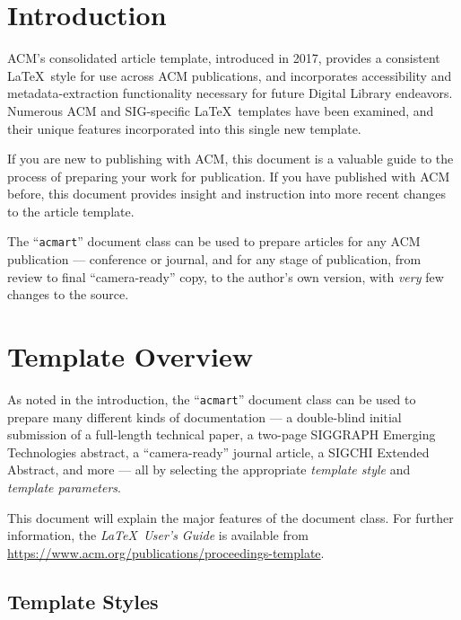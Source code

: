 \documentclass[sigplan,screen]{acmart}
\begin{document}
\maketitle

\section{Introduction}
ACM's consolidated article template, introduced in 2017, provides a
consistent \LaTeX\ style for use across ACM publications, and
incorporates accessibility and metadata-extraction functionality
necessary for future Digital Library endeavors. Numerous ACM and
SIG-specific \LaTeX\ templates have been examined, and their unique
features incorporated into this single new template.

If you are new to publishing with ACM, this document is a valuable
guide to the process of preparing your work for publication. If you
have published with ACM before, this document provides insight and
instruction into more recent changes to the article template.

The ``\verb|acmart|'' document class can be used to prepare articles
for any ACM publication --- conference or journal, and for any stage
of publication, from review to final ``camera-ready'' copy, to the
author's own version, with {\itshape very} few changes to the source.

\section{Template Overview}
As noted in the introduction, the ``\verb|acmart|'' document class can
be used to prepare many different kinds of documentation --- a
double-blind initial submission of a full-length technical paper, a
two-page SIGGRAPH Emerging Technologies abstract, a ``camera-ready''
journal article, a SIGCHI Extended Abstract, and more --- all by
selecting the appropriate {\itshape template style} and {\itshape
  template parameters}.

This document will explain the major features of the document
class. For further information, the {\itshape \LaTeX\ User's Guide} is
available from
\url{https://www.acm.org/publications/proceedings-template}.

\subsection{Template Styles}
\end{document}
